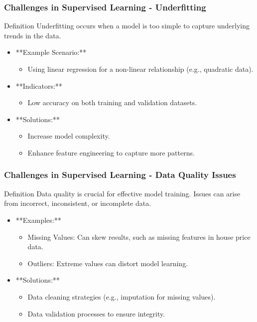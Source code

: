 \documentclass[aspectratio=169]{beamer}
\begin{document}
\begin{frame}[fragile]
    \frametitle{Challenges in Supervised Learning - Underfitting}
    \begin{block}{Definition}
        Underfitting occurs when a model is too simple to capture underlying trends in the data.
    \end{block}
    \begin{itemize}
        \item **Example Scenario:** 
            \begin{itemize}
                \item Using linear regression for a non-linear relationship (e.g., quadratic data).
            \end{itemize}
        \item **Indicators:**
            \begin{itemize}
                \item Low accuracy on both training and validation datasets.
            \end{itemize}
        \item **Solutions:**
            \begin{itemize}
                \item Increase model complexity.
                \item Enhance feature engineering to capture more patterns.
            \end{itemize}
    \end{itemize}
\end{frame}

\begin{frame}[fragile]
    \frametitle{Challenges in Supervised Learning - Data Quality Issues}
    \begin{block}{Definition}
        Data quality is crucial for effective model training. Issues can arise from incorrect, inconsistent, or incomplete data.
    \end{block}
    \begin{itemize}
        \item **Examples:**
            \begin{itemize}
                \item Missing Values: Can skew results, such as missing features in house price data.
                \item Outliers: Extreme values can distort model learning.
            \end{itemize}
        \item **Solutions:**
            \begin{itemize}
                \item Data cleaning strategies (e.g., imputation for missing values).
                \item Data validation processes to ensure integrity.
            \end{itemize}
    \end{itemize}
\end{frame}
\end{document}
